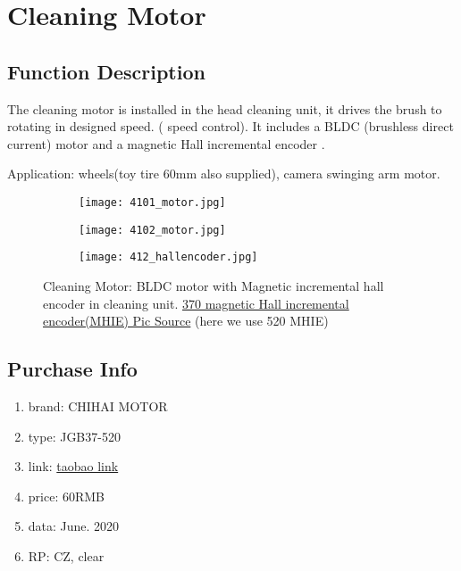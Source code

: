 \setchapterpreamble[u]{\margintoc}
\chapter{Cleaning Motor}

\section{Function Description}
The cleaning motor is installed in the head cleaning unit, it drives the brush to rotating in designed speed.
({\color{red} speed control}).
It includes a BLDC (brushless direct current) motor and a magnetic Hall incremental encoder 
. 

Application: wheels(toy tire 60mm also supplied), camera swinging arm motor.

\begin{figure}[htb]	
	\centering
	\begin{subfigure}
		\centering
		\texttt{[image: 4101\_motor.jpg]}
	\end{subfigure}
	\quad
	\begin{subfigure}
		\centering
		\texttt{[image: 4102\_motor.jpg]}
	\end{subfigure}
	\begin{subfigure}
		\centering
		\texttt{[image: 412\_hallencoder.jpg]}
	\end{subfigure}
	\caption[Cleaning Motor]{ 
		Cleaning Motor: BLDC motor with Magnetic incremental hall encoder in cleaning unit.
		\href{https://www.ebay.com/itm/370-Motor-Hall-Encoder-DC-2-5V-24V-12-PPR-Dual-Quadrature-Outputs-Metal-Encoder/283429506020}
{370 magnetic Hall incremental encoder(MHIE) Pic Source} (here we use 520 MHIE) 		
			}\label{fig:410}
\end{figure}

\section{Purchase Info}
\begin{enumerate}
	\item brand: CHIHAI MOTOR
	\item type: JGB37-520
	\item link: \href{https://item.taobao.com/item.htm?spm=a1z09.2.0.0.4a892e8d2d0m2a&id=531752422073&_u=i1s32jc02624}{taobao link} 
	\item price:  60RMB
	\item data: June. 2020
	\item RP: CZ, clear
\end{enumerate}

